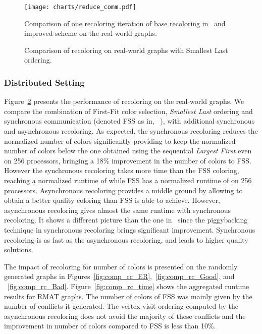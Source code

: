 \documentclass{article}
\begin{document}
\begin{figure}
  \centering
  \texttt{[image: charts/reduce\_comm.pdf]}
  \caption{Comparison of one recoloring iteration of base recoloring in~\cite{HiPC11} and improved scheme on the real-world graphs.}
  \label{fig:reduced_comm}
\end{figure}



\begin{figure}
  \centering
  \caption{Comparison of recoloring on real-world graphs with Smallest Last ordering.}
  \label{fig:comp_recolor_real}
\end{figure}

\subsubsection{Distributed Setting}
\label{sec:dist}

Figure~\ref{fig:comp_recolor_real} presents the performance of
recoloring on the real-world graphs. We compare the combination of First-Fit color selection,
{\em Smallest Last} ordering and synchronous communication (denoted FSS as in, ~\cite{HiPC11}), with
additional synchronous and asynchronous recoloring.
As expected, the synchronous
recoloring reduces the normalized number of colors significantly
providing to keep the normalized number of colors below the one
obtained using the sequential {\em Largest First} even on 256 processors,
bringing a 18\% improvement in the number of colors to FSS. However the synchronous recoloring takes more
time than the FSS coloring, reaching a normalized runtime of
 while FSS has a normalized runtime of  on 256 processors. 
Asynchronous recoloring provides a middle ground by
allowing to obtain a better quality coloring than FSS is able to
achieve. However, asynchronous recoloring gives almost the same runtime
with synchronous recoloring. It shows a different picture than the one 
in~\cite{HiPC11} since the piggybacking technique in synchronous recoloring brings significant improvement.
Synchronous recoloring is as fast as the asynchronous recoloring,
and leads to higher quality solutions.

The impact of recoloring for number of colors is presented on the randomly generated graphs
in Figures~\ref{fig:comp_rc_ER},~\ref{fig:comp_rc_Good}, and ~\ref{fig:comp_rc_Bad}.
Figure~\ref{fig:comp_rc_time} shows the aggregated runtime results for RMAT graphs.
The number of colors of FSS was mainly given by the number of conflicts it
generated. The vertex-visit ordering computed by the asynchronous
recoloring does not avoid the majority of these conflicts and the
improvement in number of colors compared to FSS is less than 10\%.
\end{document}
